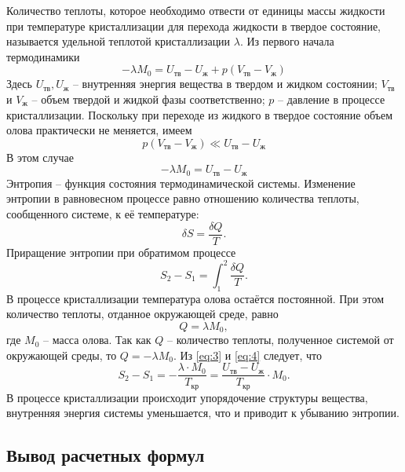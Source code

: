 \documentclass[a4paper]{article}
\begin{document}
Количество теплоты, которое необходимо отвести от единицы массы жидкости при температуре кристаллизации для перехода жидкости в твердое состояние, называется удельной теплотой кристаллизации $\lambda$. Из первого начала термодинамики
\begin{equation} \label{eq:1}
-\lambda M_0 = U_{\text{тв}} - U_{\text{ж}} + p(V_{\text{тв}} - V_{\text{ж}})
\end{equation}
Здесь $U_{\text{тв}}, U_{\text{ж}}$ – внутренняя энергия вещества в твердом и жидком состоянии; $V_{\text{тв}}$ и $V_{\text{ж}}$ – объем твердой и жидкой фазы соответственно; $p$ – давление в процессе кристаллизации. Поскольку при переходе из жидкого в твердое состояние объем олова практически не меняется, имеем
\[
p(V_{\text{тв}} - V_{\text{ж}}) \ll U_{\text{тв}} - U_{\text{ж}}
\]
В этом случае
\begin{equation} \label{eq:2}
-\lambda M_0 = U_{\text{тв}} - U_{\text{ж}}
\end{equation}
Энтропия – функция состояния термодинамической системы.
Изменение энтропии в равновесном процессе равно отношению количества теплоты, сообщенного системе, к её температуре:
\begin{equation} \label{eq:3}
\delta S = \frac{\delta Q}{T}.
\end{equation}
Приращение энтропии при обратимом процессе
\begin{equation} \label{eq:4}
S_2 - S_1 = \int_{1}^{2} \frac{\delta Q}{T}.
\end{equation}
В процессе кристаллизации температура олова остаётся постоянной. При этом количество теплоты, отданное окружающей среде, равно
\begin{equation} \label{eq:5}
Q = \lambda M_0,
\end{equation}
где $M_0$ – масса олова. Так как $Q$ – количество теплоты, полученное системой от окружающей среды, то $Q = -\lambda M_0$. Из \eqref{eq:3} и \eqref{eq:4} следует, что
\begin{equation} \label{eq:6}
S_2 - S_1 = -\frac{\lambda \cdot M_0}{T_{\text{кр}}} = \frac{U_{\text{тв}} - U_{\text{ж}}}{T_{\text{кр}}} \cdot M_0.
\end{equation}
В процессе кристаллизации происходит упорядочение структуры вещества, внутренняя энергия системы уменьшается, что и приводит к убыванию энтропии.

\subsection*{Вывод расчетных формул}
\end{document}

